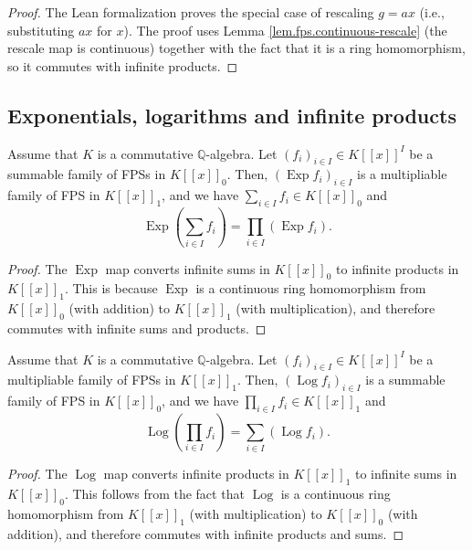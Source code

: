 \begin{proof}
The Lean formalization proves the special case of rescaling $g = ax$
(i.e., substituting $ax$ for $x$).
The proof uses Lemma \ref{lem.fps.continuous-rescale} (the rescale map is
continuous) together with the fact that it is a ring homomorphism,
so it commutes with infinite products.
\end{proof}

\subsection{Exponentials, logarithms and infinite products}

\begin{proposition}
\label{prop.fps.Exp-Log-infsum}
\leantarget
\leanok
Assume that $K$ is a commutative $\mathbb{Q}%
$-algebra. Let $\left(  f_{i}\right)  _{i\in I}\in K\left[  \left[  x\right]
\right]  ^{I}$ be a summable family of FPSs in $K\left[  \left[  x\right]
\right]  _{0}$. Then, $\left(  \operatorname{Exp}f_{i}\right)  _{i\in I}$ is
a multipliable family of FPS in $K\left[  \left[  x\right]  \right]  _{1}$,
and we have $\sum_{i\in I}f_{i}\in K\left[  \left[  x\right]  \right]  _{0}$
and%
\[
\operatorname{Exp}\left(  \sum_{i\in I}f_{i}\right)  =\prod_{i\in I}\left(
\operatorname{Exp}f_{i}\right)  .
\]
\end{proposition}

\begin{proof}
The $\operatorname{Exp}$ map converts infinite sums in $K[[x]]_0$
to infinite products in $K[[x]]_1$. This is because $\operatorname{Exp}$
is a continuous ring homomorphism from $K[[x]]_0$ (with addition) to
$K[[x]]_1$ (with multiplication), and therefore commutes with infinite sums
and products.
\end{proof}

\begin{proposition}
\label{prop.fps.Exp-Log-infprod}
\leantarget
\leanok
Assume that $K$ is a commutative $\mathbb{Q}%
$-algebra. Let $\left(  f_{i}\right)  _{i\in I}\in K\left[  \left[  x\right]
\right]  ^{I}$ be a multipliable family of FPSs in $K\left[  \left[  x\right]
\right]  _{1}$. Then, $\left(  \operatorname{Log}f_{i}\right)  _{i\in I}$ is
a summable family of FPS in $K\left[  \left[  x\right]  \right]  _{0}$, and we
have $\prod\limits_{i\in I}f_{i}\in K\left[  \left[  x\right]  \right]  _{1}$
and%
\[
\operatorname{Log}\left(  \prod\limits_{i\in I}f_{i}\right)  =\sum_{i\in
I}\left(  \operatorname{Log}f_{i}\right)  .
\]
\end{proposition}

\begin{proof}
The $\operatorname{Log}$ map converts infinite products in $K[[x]]_1$
to infinite sums in $K[[x]]_0$. This follows from the fact that
$\operatorname{Log}$ is a continuous ring homomorphism from $K[[x]]_1$
(with multiplication) to $K[[x]]_0$ (with addition), and therefore commutes
with infinite products and sums.
\end{proof}
